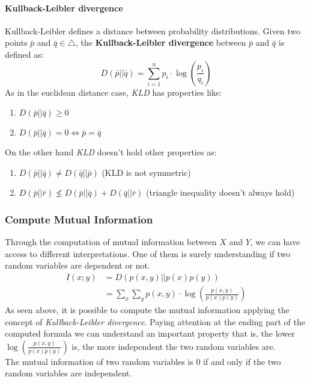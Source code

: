 \paragraph{Kullback-Leibler divergence} 
Kullback-Leibler defines a distance between probability distributions. 
Given two points $\bar{p}$ and $\bar{q} \in \bigtriangleup$, the \textbf{Kullback-Leibler divergence} between $\bar{p}$ and $\bar{q}$ is defined as:
$$D(\bar{p} || \bar{q}) = \sum_{i=1}^n p_i \cdot \log\left( \frac{p_i}{q_i}\right)$$
As in the euclidean distance case, \textit{KLD} has properties like:
\begin{enumerate}
	\item $D(\bar{p} || \bar{q}) \geq 0$
	\item $D(\bar{p} || \bar{q}) = 0 \iff \bar{p} = \bar{q}$
\end{enumerate}
On the other hand \textit{KLD} doesn't hold other properties as:
\begin{enumerate}
	\item $D(\bar{p} || \bar{q}) \neq D(\bar{q} || \bar{p})$ (KLD is not symmetric)
	\item $D(\bar{p} || \bar{r}) \nleq D(\bar{p} || \bar{q}) + D(\bar{q} || \bar{r})$ (triangle inequality doesn't always hold) 
\end{enumerate}
\par \bigskip \noindent

\subsubsection{Compute Mutual Information}
Through the computation of mutual information between $X$ and $Y$, we can have access to different interpretations. One of them is surely understanding if two random variables are dependent or not. 
\begin{equation*}
\begin{split}
I(x;y) &= D(p(x,y)||p(x)p(y))\\
&=\sum_x \sum_y p(x,y) \cdot \log\left(\frac{p(x,y)}{p(x)p(y)} \right)
\end{split}
\end{equation*}
As seen above, it is possible to compute the mutual information applying the concept of \textit{Kullback-Leibler divergence}. Paying attention at the ending part of the computed formula we can understand an important property that is, the lower $\log\left(\frac{p(x,y)}{p(x)p(y)} \right)$ is, the more independent the two random variables are.\\
The mutual information of two random variables is 0 if and only if the two random variables are independent.

